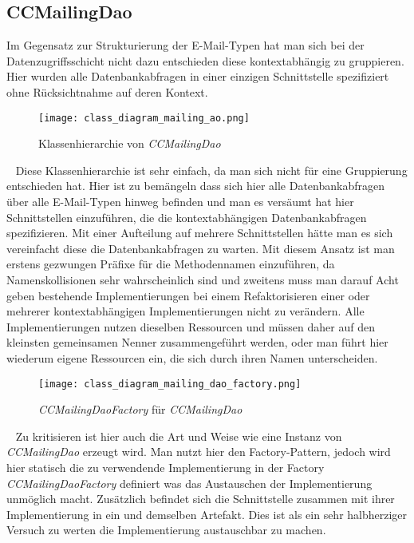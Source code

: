 \subsection{CCMailingDao}
Im Gegensatz zur Strukturierung der E-Mail-Typen hat man sich bei der Datenzugriffsschicht nicht dazu entschieden diese kontextabhängig zu gruppieren. Hier wurden alle Datenbankabfragen in einer einzigen Schnittstelle spezifiziert ohne Rücksichtnahme auf deren Kontext.
\begin{figure}[h]
\centering
\texttt{[image: class\_diagram\_mailing\_ao.png]} 
\caption{Klassenhierarchie von \emph{CCMailingDao}}
\label{fig:class-hierarchie-ccmailing-dao}
\end{figure}
\ \newline
Diese Klassenhierarchie ist sehr einfach, da man sich nicht für eine Gruppierung entschieden hat. Hier ist zu bemängeln dass sich hier alle Datenbankabfragen über alle E-Mail-Typen hinweg befinden und man es versäumt hat hier Schnittstellen einzuführen, die die kontextabhängigen Datenbankabfragen spezifizieren. Mit einer Aufteilung auf mehrere Schnittstellen hätte man es sich vereinfacht diese die Datenbankabfragen zu warten. Mit diesem Ansatz ist man erstens gezwungen Präfixe für die Methodennamen einzuführen, da Namenskollisionen sehr wahrscheinlich sind und zweitens muss man darauf Acht geben bestehende Implementierungen bei einem Refaktorisieren einer oder mehrerer kontextabhängigen Implementierungen nicht zu verändern. Alle Implementierungen nutzen dieselben Ressourcen und müssen daher auf den kleinsten gemeinsamen Nenner zusammengeführt werden, oder man führt hier wiederum eigene Ressourcen ein, die sich durch ihren Namen unterscheiden.
\newpage
\begin{figure}[h]
\centering
\texttt{[image: class\_diagram\_mailing\_dao\_factory.png]} 
\caption{\emph{CCMailingDaoFactory} für \emph{CCMailingDao}}
\label{fig:class-hierarchie-ccbasicemail}
\end{figure}
\ \newline
Zu kritisieren ist hier auch die Art und Weise wie eine Instanz von \emph{CCMailingDao} erzeugt wird. Man nutzt hier den Factory-Pattern, jedoch wird hier statisch die zu verwendende Implementierung in der Factory \emph{CCMailingDaoFactory} definiert was das Austauschen der Implementierung unmöglich macht. Zusätzlich befindet sich die Schnittstelle zusammen mit ihrer Implementierung in ein und demselben Artefakt. Dies ist als ein sehr halbherziger Versuch zu werten die Implementierung austauschbar zu machen.  
\newpage
